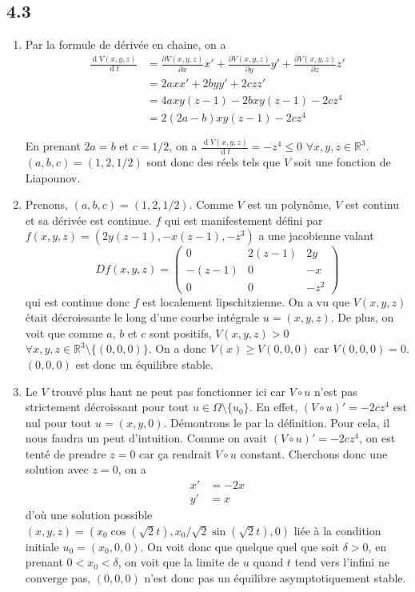 \documentclass{article}
\DeclareMathOperator{\newdiff}{d} %
\newcommand{\dif}{\newdiff\!}
\newcommand{\fpart}[2]{\frac{\partial #1}{\partial #2}}
\newcommand{\fdif}[2]{\frac{\dif #1}{\dif #2}}
\begin{document}
\subsection*{4.3}
\begin{enumerate}
  \item
    Par la formule de dérivée en chaine, on a
    \begin{align*}
      \fdif{V(x,y,z)}{t} & = \fpart{V(x,y,z)}{x} x' +
      \fpart{V(x,y,z)}{y} y' + \fpart{V(x,y,z)}{z} z'\\
      & = 2axx' + 2byy' + 2czz'\\
      & = 4axy(z-1) - 2bxy(z-1) - 2cz^4\\
      & = 2(2a-b)xy(z-1) - 2cz^4
    \end{align*}

    En prenant $2a = b$ et $c = 1/2$, on a
    $\fdif{V(x,y,z)}{t} = -z^4 \leq 0$ $\forall x,y,z \in \mathbb{R}^3$.
    $(a,b,c) = (1,2,1/2)$ sont donc des réels tels que $V$ soit une
    fonction de Liapounov.
  \item
    Prenons, $(a,b,c) = (1,2,1/2)$.
    Comme $V$ est un polynôme, $V$ est continu et sa dérivée est continue.
    $f$ qui est manifestement défini par
    $f(x,y,z) = (2y(z-1), -x(z-1), -z^3)$ a une jacobienne valant
    \[ Df(x,y,z) =
    \begin{pmatrix}
      0 & 2(z-1) & 2y\\
      -(z-1) & 0 & -x\\
      0 & 0 & -z^2
    \end{pmatrix}
    \]
    qui est continue donc $f$ est localement lipschitzienne.
    On a vu que $V(x,y,z)$ était décroissante le long d'une courbe
    intégrale $u = (x,y,z)$.
    De plus, on voit que comme $a$, $b$ et $c$ sont positifs,
    $V(x,y,z) > 0$ $\forall x,y,z \in \mathbb{R}^3\setminus\{(0,0,0)\}$.
    On a donc $V(x) \geq V(0,0,0)$ car $V(0,0,0) = 0$.
    $(0,0,0)$ est donc un équilibre stable.
  \item
    Le $V$ trouvé plus haut ne peut pas fonctionner ici
    car $V \circ u$ n'est pas strictement décroissant pour tout
    $u \in \Omega \setminus \{u_0\}$.
    En effet, $(V \circ u)' = -2cz^4$
    est nul pour tout $u = (x,y,0)$.
    Démontrons le par la définition.
    Pour cela, il nous faudra un peut d'intuition.
    Comme on avait $(V \circ u)' = -2cz^4$, on est tenté de prendre $z = 0$
    car ça rendrait $V \circ u$ constant.
    Cherchons donc une solution avec $z = 0$, on a
    \begin{align*}
      x' & = -2x\\
      y' & = x
    \end{align*}
    d'où une solution possible
    $(x,y,z) = (x_0\cos(\sqrt{2}t),x_0/\sqrt{2}\sin(\sqrt{2}t),0)$ liée
    à la condition initiale $u_0 = (x_0,0,0)$.
    On voit donc que quelque quel que soit $\delta > 0$,
    en prenant $0 < x_0 < \delta$,
    on voit que la limite de $u$ quand $t$ tend vers l'infini ne converge pas,
    $(0,0,0)$ n'est donc pas un équilibre asymptotiquement stable.
\end{enumerate}
\end{document}

